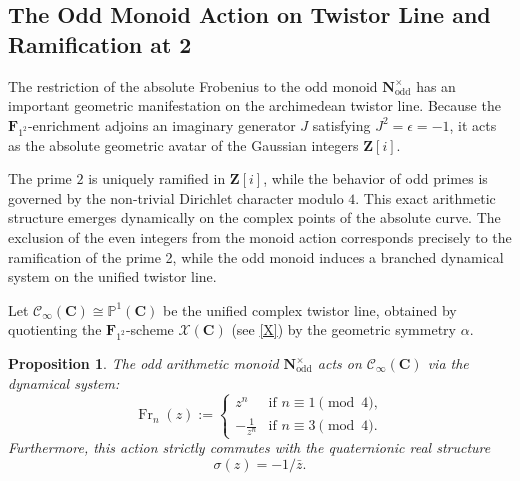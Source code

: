 \documentclass[11pt,a4paper]{article}
\let\mathscr\mathscr
\newtheorem{proposition}[theorem]{Proposition}
\newcommand{\C}{\mathbf{C}}
\newcommand{\N}{\mathbf{N}}
\newcommand{\Z}{\mathbf{Z}}
\newcommand{\Ftwo}{\mathbf{F}_{1^2}}
\newcommand{\minf}{\mathscr C_\infty}
\newcommand{\frob}{{\operatorname{Fr}}}
\begin{document}
\subsection{The Odd Monoid Action on Twistor Line and  Ramification at 2}

The restriction of the absolute Frobenius to the odd monoid $\N^\times_{\text{odd}}$ has an important geometric manifestation on the archimedean twistor line. Because the $\Ftwo$-enrichment adjoins an imaginary generator $J$ satisfying $J^2 = \epsilon = -1$, it acts as the absolute geometric avatar of the Gaussian integers $\Z[i]$. 

The prime $2$ is uniquely ramified in $\Z[i]$, while the behavior of odd primes is governed by the non-trivial Dirichlet character modulo $4$. This exact arithmetic structure emerges dynamically on the complex points of the absolute curve. The exclusion of the even integers from the monoid action corresponds precisely to the ramification of the prime 2, while the odd monoid induces a branched dynamical system on the unified twistor line.\vspace{.05in}

Let  $\minf(\C) \cong \mathbb{P}^1(\C)$  be the unified complex twistor line, obtained by quotienting the $\Ftwo$-scheme $\mathcal X(\C)$ (see \eqref{X}) by the geometric symmetry $\alpha$.

\begin{proposition}\label{prop:twistor_frobenius}
 The odd arithmetic monoid $\N^\times_{\text{odd}}$ acts on $\minf(\C)$ via the dynamical system:
\begin{equation*}
\frob_n(z) := 
\begin{cases} 
z^n & \text{if } n \equiv 1 \pmod 4, \\
-\frac{1}{z^n} & \text{if } n \equiv 3 \pmod 4.
\end{cases}
\end{equation*}
Furthermore, this action strictly commutes with the quaternionic real structure $$\sigma(z) = -1/\bar{z}.$$
\end{proposition}
\end{document}
